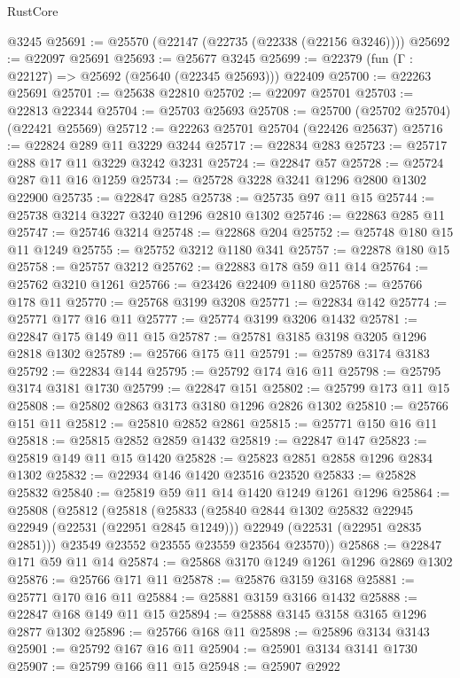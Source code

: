 \begin{lexlean}{RustCore}
\begin{coremodule}
    @3245
@25691 := @25570 (@22147 (@22735 (@22338 (@22156 @3246))))
@25692 := @22097 @25691
@25693 := @25677 @3245
@25699 := @22379 (fun (Γ : @22127) => @25692 (@25640 (@22345 @25693))) @22409
@25700 := @22263 @25691
@25701 := @25638 @22810
@25702 := @22097 @25701
@25703 := @22813 @22344
@25704 := @25703 @25693
@25708 := @25700 (@25702 @25704) (@22421 @25569)
@25712 := @22263 @25701 @25704 (@22426 @25637)
@25716 := @22824 @289 @11 @3229 @3244
@25717 := @22834 @283
@25723 := @25717 @288 @17 @11 @3229 @3242 @3231
@25724 := @22847 @57
@25728 := @25724 @287 @11 @16 @1259
@25734 := @25728 @3228 @3241 @1296 @2800 @1302 @22900
@25735 := @22847 @285
@25738 := @25735 @97 @11 @15
@25744 := @25738 @3214 @3227 @3240 @1296 @2810 @1302
@25746 := @22863 @285 @11
@25747 := @25746 @3214
@25748 := @22868 @204
@25752 := @25748 @180 @15 @11 @1249
@25755 := @25752 @3212 @1180 @341
@25757 := @22878 @180 @15
@25758 := @25757 @3212
@25762 := @22883 @178 @59 @11 @14
@25764 := @25762 @3210 @1261
@25766 := @23426 @22409 @1180
@25768 := @25766 @178 @11
@25770 := @25768 @3199 @3208
@25771 := @22834 @142
@25774 := @25771 @177 @16 @11
@25777 := @25774 @3199 @3206 @1432
@25781 := @22847 @175 @149 @11 @15
@25787 := @25781 @3185 @3198 @3205 @1296 @2818 @1302
@25789 := @25766 @175 @11
@25791 := @25789 @3174 @3183
@25792 := @22834 @144
@25795 := @25792 @174 @16 @11
@25798 := @25795 @3174 @3181 @1730
@25799 := @22847 @151
@25802 := @25799 @173 @11 @15
@25808 := @25802 @2863 @3173 @3180 @1296 @2826 @1302
@25810 := @25766 @151 @11
@25812 := @25810 @2852 @2861
@25815 := @25771 @150 @16 @11
@25818 := @25815 @2852 @2859 @1432
@25819 := @22847 @147
@25823 := @25819 @149 @11 @15 @1420
@25828 := @25823 @2851 @2858 @1296 @2834 @1302
@25832 := @22934 @146 @1420 @23516 @23520
@25833 := @25828 @25832
@25840 := @25819 @59 @11 @14 @1420 @1249 @1261 @1296
@25864 := @25808
    (@25812
      (@25818
        (@25833
          (@25840 @2844 @1302 @25832 @22945 @22949 (@22531 (@22951 @2845 @1249)))
          @22949
          (@22531 (@22951 @2835 @2851)))
        @23549
        @23552
        @23555
        @23559
        @23564
        @23570))
@25868 := @22847 @171 @59 @11 @14
@25874 := @25868 @3170 @1249 @1261 @1296 @2869 @1302
@25876 := @25766 @171 @11
@25878 := @25876 @3159 @3168
@25881 := @25771 @170 @16 @11
@25884 := @25881 @3159 @3166 @1432
@25888 := @22847 @168 @149 @11 @15
@25894 := @25888 @3145 @3158 @3165 @1296 @2877 @1302
@25896 := @25766 @168 @11
@25898 := @25896 @3134 @3143
@25901 := @25792 @167 @16 @11
@25904 := @25901 @3134 @3141 @1730
@25907 := @25799 @166 @11 @15
@25948 := @25907
    @2922

\end{coremodule}
\end{lexlean}
